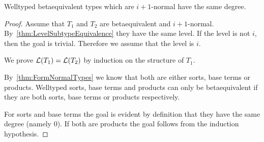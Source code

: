 \begin{theorem}
    Welltyped betaequivalent types which are $i+1$-normal have the same degree.
    \label{thm:BetaEquivalentSameDegree}
    \begin{proof}
        Assume that $T_1$ and $T_2$ are betaequivalent and $i+1$-normal.
        By~\ref{thm:LevelSubtypeEquivalence} they have the same level. If the
        level is not $i$, then the goal is trivial. Therefore we assume that the
        level is $i$.

        We prove ${\cal L}(T_1) = {\cal L}(T_2)$ by induction on the structure of
        $T_1$.

        By~\ref{thm:FormNormalTypes} we know that both are either sorts, base
        terms or products. Welltyped sorts, base terms and products can only be
        betaequivalent if they are both sorts, base terms or products respectively.


        For sorts and base terms the goal is evident by definition that
        they have the same degree (namely 0). If both are products the goal
        follows from the induction hypothesis.
    \end{proof}
\end{theorem}



